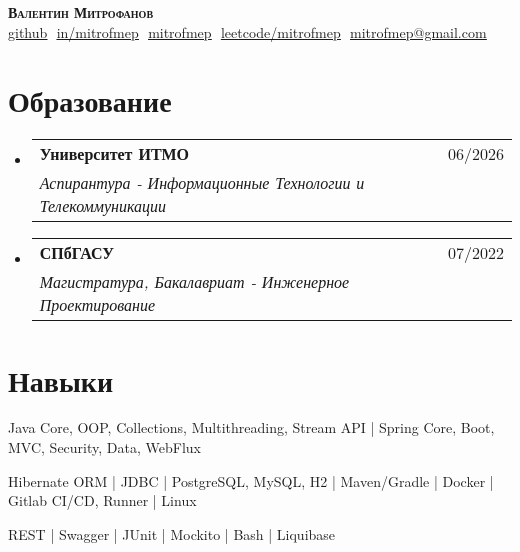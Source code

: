 \documentclass[letterpaper,11pt]{article}
\makeatletter
\newcommand{\resumeSubheading}[4]{
  \vspace{-2pt}\item
    \begin{tabular*}{0.97\textwidth}[t]{l@{\extracolsep{\fill}}r}
      \textbf{#1} & #2 \\
      \textit{\small#3} & \textit{\small #4} \\
    \end{tabular*}\vspace{-7pt}
}
\newcommand{\resumeSubHeadingListStart}{\begin{itemize}[leftmargin=0.15in, label={}]}
\newcommand{\resumeSubHeadingListEnd}{\end{itemize}}
\makeatother
\begin{document}
\begin{flushright}
  \vspace{-4pt}
  \color{gray}
  \item
\end{flushright}

\vspace{-7pt}

\begin{center}
\vspace{-7pt}
    \textbf{\Huge \scshape Валентин Митрофанов} \\ \vspace{8pt}
    \small 
    \href{https://github.com/mitrofmep}
    {\underline{github}} $  $
    \href{https://linkedin.com/in/mitrofmep}
    {\underline{in/mitrofmep}} $  $
    \href{https://t.me/mitrofmep}
    {\underline{mitrofmep}} $  $
    \href{https://leetcode.com/mitrofmep/}
    {\underline{leetcode/mitrofmep}} $  $
    \href{mailto:mitrofmep@gmail.com}
    {\underline{mitrofmep@gmail.com}}
\end{center}

\section{Образование}
  \resumeSubHeadingListStart
  
    \resumeSubheading
      {Университет ИТМО}{06/2026}
      {Аспирантура - Информационные Технологии и Телекоммуникации}{}

    \resumeSubheading
      {СПбГАСУ}{07/2022}
      {Магистратура, Бакалавриат - Инженерное Проектирование}{}


  \resumeSubHeadingListEnd

\section{Навыки}
\begin{itemize}[leftmargin=0.15in, label={}, itemsep=-1pt]
    \small{
        \item Java Core, OOP, Collections, Multithreading, Stream API | Spring Core, Boot, MVC, Security, Data, WebFlux\\
        \item Hibernate ORM | JDBC | PostgreSQL, MySQL, H2 | Maven/Gradle | Docker | Gitlab CI/CD, Runner | Linux \\
        \item REST | Swagger | JUnit | Mockito | Bash | Liquibase \\
    }
\end{itemize}
\end{document}
